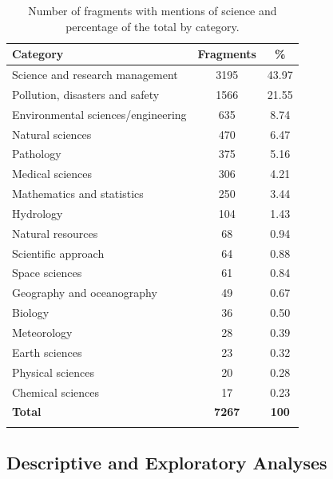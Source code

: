 \documentclass[pdflatex,sn-mathphys-num,iicol]{sn-jnl}
\begin{document}
	\begin{table}[t]
		\caption{Number of fragments with mentions of science and percentage of the total by category.}
		\label{tab:res_fragmentos_subcategoria}
		{\footnotesize
			\begin{tabular}{@{}p{4.2cm}cc@{}}
				\toprule
				\textbf{Category} & \textbf{Fragments} & \textbf{\%} \\
				\midrule
				Science and research management    & 3195 & 43.97 \\
				Pollution, disasters and safety    & 1566 & 21.55 \\
				Environmental sciences/engineering & 635  & 8.74  \\
				Natural sciences                   & 470  & 6.47  \\
				Pathology                          & 375  & 5.16  \\
				Medical sciences                   & 306  & 4.21  \\
				Mathematics and statistics         & 250  & 3.44  \\
				Hydrology                          & 104  & 1.43  \\
				Natural resources                  & 68   & 0.94  \\
				Scientific approach                & 64   & 0.88  \\
				Space sciences                     & 61   & 0.84  \\
				Geography and oceanography         & 49   & 0.67  \\
				Biology                            & 36   & 0.50  \\
				Meteorology                        & 28   & 0.39  \\
				Earth sciences                     & 23   & 0.32  \\
				Physical sciences                  & 20   & 0.28  \\
				Chemical sciences                  & 17   & 0.23  \\
				\midrule
				\textbf{Total}                     & \textbf{7267} & \textbf{100} \\
				\botrule
			\end{tabular}
		}
	\end{table}
	
	\subsection{Descriptive and Exploratory Analyses}\label{subsec:descriptive_results}
	
\end{document}
